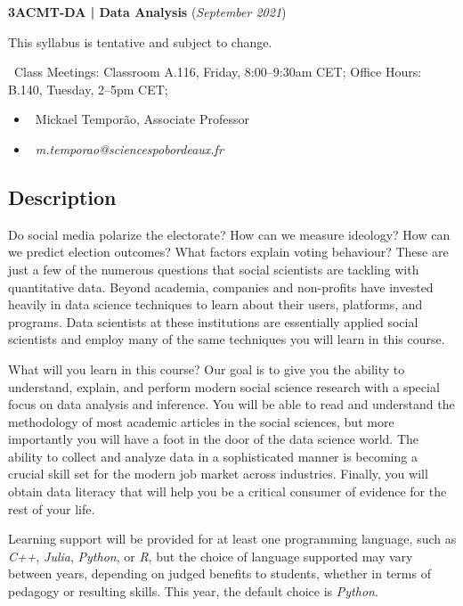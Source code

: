 \documentclass{article}
\begin{document}
\begin{center}
    {\Large\textbf{3ACMT-DA | Data Analysis} (\textit{September 2021})}

This syllabus is tentative and subject to change.

{\small
    \faClock~Class Meetings: Classroom A.116, Friday, 8:00--9:30am CET; Office Hours: B.140, Tuesday, 2--5pm CET;
}

\end{center}

\begin{itemize}
    \item \faUser~Mickael Temporão, Associate Professor
    \item \faEnvelope~\textit{m.temporao@sciencespobordeaux.fr}
\end{itemize}


\subsection*{Description}
Do social media polarize the electorate? How can we measure ideology? How can we predict election outcomes? What factors explain voting behaviour? These are just a few of the numerous questions that social scientists are tackling with quantitative data. Beyond academia, companies and non-profits have invested heavily in data science techniques to learn about their users, platforms, and programs. Data scientists at these institutions are essentially applied social scientists and employ many of the same techniques you will learn in this course.

What will you learn in this course?
Our goal is to give you the ability to understand, explain, and perform modern social science research with a special focus on data analysis and inference. You will be able to read and understand the methodology of most academic articles in the social sciences, but more importantly you will have a foot in the door of the data science world. The ability to collect and analyze data in a sophisticated manner is becoming a crucial skill set for the modern job market across industries. Finally, you will obtain data literacy that will help you be a critical consumer of evidence for the rest of your life.

Learning support will be provided for at least one programming language, such as \textit{C++}, \textit{Julia}, \textit{Python}, or \textit{R}, but the choice of language supported may vary between years, depending on judged benefits to students, whether in terms of pedagogy or resulting skills. This year, the default choice is \textit{Python}.
\end{document}
